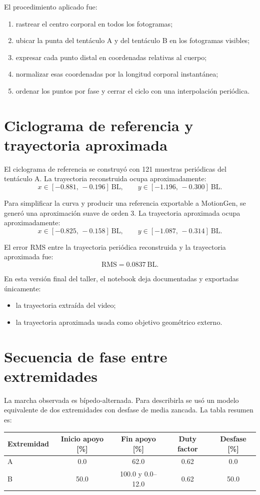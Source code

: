 \documentclass[11pt]{article}
\begin{document}
El procedimiento aplicado fue:
\begin{enumerate}[leftmargin=1.6em]
\item rastrear el centro corporal en todos los fotogramas;
\item ubicar la punta del tentáculo A y del tentáculo B en los fotogramas visibles;
\item expresar cada punto distal en coordenadas relativas al cuerpo;
\item normalizar esas coordenadas por la longitud corporal instantánea;
\item ordenar los puntos por fase y cerrar el ciclo con una interpolación periódica.
\end{enumerate}

\section*{Ciclograma de referencia y trayectoria aproximada}
El ciclograma de referencia se construyó con \num{121} muestras periódicas del tentáculo A. La trayectoria reconstruida ocupa aproximadamente:
\[
x \in [-0.881,\,-0.196]\ \text{BL}, \qquad
y \in [-1.196,\,-0.300]\ \text{BL}.
\]

Para simplificar la curva y producir una referencia exportable a MotionGen, se generó una aproximación suave de orden 3. La trayectoria aproximada ocupa aproximadamente:
\[
x \in [-0.825,\,-0.158]\ \text{BL}, \qquad
y \in [-1.087,\,-0.314]\ \text{BL}.
\]

El error RMS entre la trayectoria periódica reconstruida y la trayectoria aproximada fue:
\[
\text{RMS} = 0.0837\ \text{BL}.
\]

En esta versión final del taller, el notebook deja documentadas y exportadas únicamente:
\begin{itemize}[leftmargin=1.6em]
\item la trayectoria extraída del video;
\item la trayectoria aproximada usada como objetivo geométrico externo.
\end{itemize}

\section*{Secuencia de fase entre extremidades}
La marcha observada es bípedo-alternada. Para describirla se usó un modelo equivalente de dos extremidades con desfase de media zancada. La tabla resumen es:

\begin{center}
\begin{tabular}{lcccc}
\toprule
Extremidad & Inicio apoyo [\%] & Fin apoyo [\%] & Duty factor & Desfase [\%] \\
\midrule
A & 0.0 & 62.0 & 0.62 & 0.0 \\
B & 50.0 & 100.0 y 0.0--12.0 & 0.62 & 50.0 \\
\bottomrule
\end{tabular}
\end{center}
\end{document}
